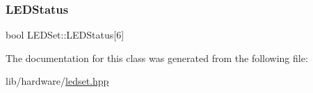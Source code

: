 \mbox{\label{classLEDSet_a54945652a2ba428b70ad620e88b4ab60}} 
\subsubsection{\texorpdfstring{L\+E\+D\+Status}{LEDStatus}}
{\footnotesize\ttfamily bool L\+E\+D\+Set\+::\+L\+E\+D\+Status\mbox{[}6\mbox{]}}



The documentation for this class was generated from the following file\+:\begin{DoxyCompactItemize}
\item 
lib/hardware/\hyperlink{ledset_8hpp}{ledset.\+hpp}\end{DoxyCompactItemize}
